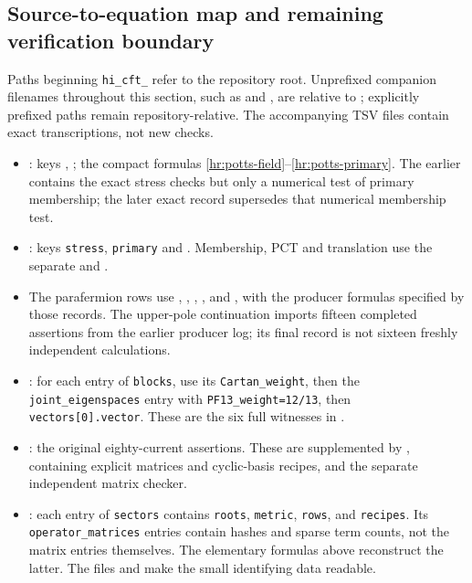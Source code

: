 \subsection{Source-to-equation map and remaining verification boundary}

Paths beginning \texttt{hi\_cft\_} refer to the repository root.
Unprefixed companion filenames throughout this section, such as
 and , are
relative to ; explicitly prefixed
paths remain repository-relative.  The accompanying TSV files
contain exact transcriptions, not new checks.
\begin{itemize}
\item {}:
keys , ;
the compact formulas \eqref{hr:potts-field}--\eqref{hr:potts-primary}.
The earlier  contains the
exact stress checks but only a numerical test of primary membership;
the later exact record supersedes that numerical membership test.
\item {}:
keys \texttt{stress}, \texttt{primary} and
.
Membership, PCT and translation use the separate
 and
.
\item The parafermion rows use
,
,
,
, and
, with the producer
formulas specified by those records. The upper-pole continuation
imports fifteen completed assertions from the earlier producer log;
its final record is not sixteen freshly independent calculations.
\item {}:
for each entry of \texttt{blocks}, use its
\texttt{Cartan\_weight}, then the \texttt{joint\_eigenspaces}
entry with \texttt{PF13\_weight=12/13}, then
\texttt{vectors[0].vector}. These are the six full witnesses
in .
\item {}:
the original eighty-current assertions. These are supplemented by
, containing explicit matrices and
cyclic-basis recipes, and the separate independent matrix checker.
\item {}:
each entry of \texttt{sectors} contains \texttt{roots},
\texttt{metric}, \texttt{rows}, and \texttt{recipes}.
Its \texttt{operator\_matrices} entries contain hashes and sparse
term counts, not the matrix entries themselves. The elementary
formulas above reconstruct the latter. The files
 and
 make the small identifying data readable.
\end{itemize}

